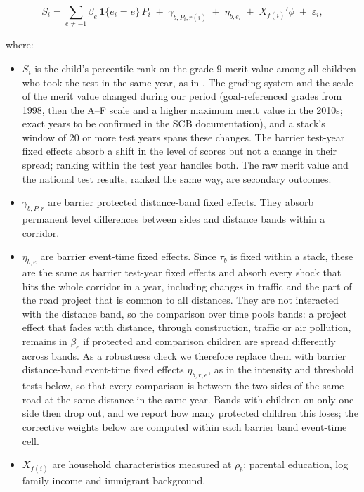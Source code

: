 \documentclass[11pt]{article}
\begin{document}
\[
S_i = \sum_{e \neq -1} \beta_e \,\mathbf{1}\{e_i = e\}\, P_i \;+\; \gamma_{b, P_i, r(i)} \;+\; \eta_{b, e_i} \;+\; X_{f(i)}'\phi \;+\; \varepsilon_i ,
\]

where:

\begin{itemize}
\item \(S_i\) is the child's percentile rank on the grade-9 merit value among all children who took the test in the same year, as in \textcite{gronqvistUnderstandingHowLow2020}. The grading system and the scale of the merit value changed during our period (goal-referenced grades from 1998, then the A--F scale and a higher maximum merit value in the 2010s; exact years to be confirmed in the SCB documentation), and a stack's window of 20 or more test years spans these changes. The barrier \texttimes{} test-year fixed effects absorb a shift in the level of scores but not a change in their spread; ranking within the test year handles both. The raw merit value and the national test results, ranked the same way, are secondary outcomes.
\item \(\gamma_{b,P,r}\) are barrier \texttimes{} protected \texttimes{} distance-band fixed effects. They absorb permanent level differences between sides and distance bands within a corridor.
\item \(\eta_{b,e}\) are barrier \texttimes{} event-time fixed effects. Since \(\tau_b\) is fixed within a stack, these are the same as barrier \texttimes{} test-year fixed effects and absorb every shock that hits the whole corridor in a year, including changes in traffic and the part of the road project that is common to all distances. They are not interacted with the distance band, so the comparison over time pools bands: a project effect that fades with distance, through construction, traffic or air pollution, remains in \(\beta_e\) if protected and comparison children are spread differently across bands. As a robustness check we therefore replace them with barrier \texttimes{} distance-band \texttimes{} event-time fixed effects \(\eta_{b,r,e}\), as in the intensity and threshold tests below, so that every comparison is between the two sides of the same road at the same distance in the same year. Bands with children on only one side then drop out, and we report how many protected children this loses; the corrective weights below are computed within each barrier \texttimes{} band \texttimes{} event-time cell.
\item \(X_{f(i)}\) are household characteristics measured at \(\rho_b\): parental education, log family income and immigrant background.
\end{itemize}
\end{document}
